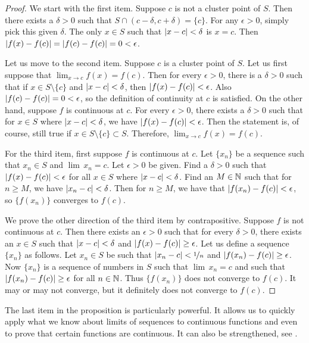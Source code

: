 \begin{proof}
We start with the first item.  Suppose $c$ is not a cluster point of
$S$.  Then there exists a $\delta > 0$
such that $S \cap (c-\delta,c+\delta) = \{ c \}$.
For any $\epsilon > 0$, simply pick this given $\delta$.
The only $x \in S$ such that $\left\lvert {x-c} \right\rvert < \delta$ is $x=c$.  Then
$\left\lvert {f(x)-f(c)} \right\rvert = \left\lvert {f(c)-f(c)} \right\rvert = 0 < \epsilon$.

Let us move to the second item.
Suppose $c$ is a cluster point of $S$.  Let us first suppose
that $\lim_{x\to c} f(x) = f(c)$.  Then for every $\epsilon > 0$,
there is a $\delta > 0$ such that if $x \in S \setminus \{ c \}$
and $\left\lvert {x-c} \right\rvert < \delta$, then $\left\lvert {f(x)-f(c)} \right\rvert < \epsilon$.
Also $\left\lvert {f(c)-f(c)} \right\rvert = 0 < \epsilon$, so the definition of continuity at
$c$ is satisfied.  On the other hand, suppose $f$ is continuous
at $c$.  For every $\epsilon > 0$, there exists a $\delta > 0$
such that for $x \in S$ where $\left\lvert {x-c} \right\rvert < \delta$, we have
$\left\lvert {f(x)-f(c)} \right\rvert < \epsilon$.  Then the statement is, of course, still true if
$x \in S \setminus \{ c \} \subset S$.  Therefore, $\lim_{x\to c} f(x) =
f(c)$.

For the third item, first suppose $f$ is continuous at $c$.  Let $\{ x_n \}$
be a sequence such that $x_n \in S$ and $\lim\, x_n = c$.  Let $\epsilon > 0$
be given.  Find a $\delta > 0$ such that $\left\lvert {f(x)-f(c)} \right\rvert < \epsilon$
for all $x \in S$ where $\left\lvert {x-c} \right\rvert < \delta$.  Find an $M \in {\mathbb{N}}$
such that for $n \geq M$, we have $\left\lvert {x_n-c} \right\rvert < \delta$.  Then for
$n \geq M$, we have that $\left\lvert {f(x_n)-f(c)} \right\rvert < \epsilon$,
so $\bigl\{ f(x_n) \bigr\}$
converges to $f(c)$.

We prove the other direction of the third item by contrapositive.
Suppose $f$ is not
continuous at $c$.  Then there exists an $\epsilon > 0$
such that for every $\delta > 0$, there exists an $x \in S$
such that $\left\lvert {x-c} \right\rvert < \delta$ and $\left\lvert {f(x)-f(c)} \right\rvert \geq \epsilon$.
Let us define a sequence $\{ x_n \}$ as follows.
Let $x_n \in S$ be such that $\left\lvert {x_n-c} \right\rvert < \nicefrac{1}{n}$
and $\left\lvert {f(x_n)-f(c)} \right\rvert \geq \epsilon$.
Now $\{ x_n \}$ is
a sequence of numbers in $S$ such that
$\lim\, x_n = c$ and such that
$\left\lvert {f(x_n)-f(c)} \right\rvert \geq \epsilon$ for all $n \in {\mathbb{N}}$.  Thus $\{ f(x_n) \}$
does not converge to $f(c)$.  It may or may not converge, but it definitely
does not converge to $f(c)$.  
\end{proof}

The last item in the proposition is particularly powerful.  It allows us to
quickly apply what we know about limits of sequences to continuous functions
and even to prove that certain functions are continuous.
It can also be strengthened, see .

